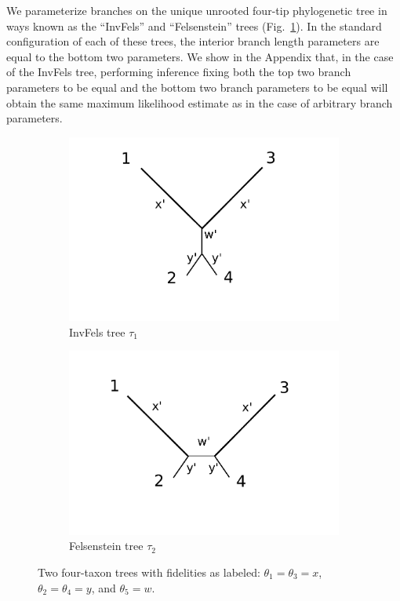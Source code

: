 \documentclass[11pt]{article}
\begin{document}
We parameterize branches on the unique unrooted four-tip phylogenetic tree in ways known as the ``InvFels'' and ``Felsenstein'' trees (Fig.~\ref{fig:farris-fels-top}).
In the standard configuration of each of these trees, the interior branch length parameters are equal to the bottom two parameters.
We show in the Appendix that, in the case of the InvFels tree, performing inference fixing both the top two branch parameters to be equal and the bottom two branch parameters to be equal will obtain the same maximum likelihood estimate as in the case of arbitrary branch parameters.

\begin{figure}
\centering
\begin{subfigure}{.45\linewidth}
\centering
\includegraphics[width=\textwidth]{farris_blank}
\caption[short]{InvFels tree $\tau_1$}
\end{subfigure}
\begin{subfigure}{.45\linewidth}
\centering
\includegraphics[width=\textwidth]{felsenstein_blank}
\caption[short]{Felsenstein tree $\tau_2$}
\end{subfigure}
\caption{Two four-taxon trees with fidelities as labeled: $\theta_1=\theta_3=x$, $\theta_2=\theta_4=y$, and $\theta_5=w$.
}
\label{fig:farris-fels-top}
\end{figure}
\end{document}
